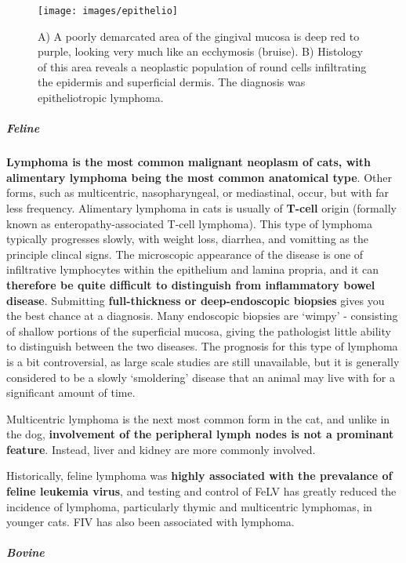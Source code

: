 \documentclass[openany]{article}
\let\oldsubparagraph\subparagraph
\renewcommand{\subparagraph}[1]{\oldsubparagraph{#1}\mbox{}}
\begin{document}
\begin{figure}

{\centering \texttt{[image: images/epithelio]} 

}

\caption{A) A poorly demarcated area of the gingival mucosa is deep red to purple, looking very much like an ecchymosis (bruise). B) Histology of this area reveals a neoplastic population of round cells infiltrating the epidermis and superficial dermis. The diagnosis was epitheliotropic lymphoma.}\label{fig:epithelio}
\end{figure}

\subparagraph{Feline}\label{feline}

\textbf{Lymphoma is the most common malignant neoplasm of cats, with
alimentary lymphoma being the most common anatomical type}. Other forms,
such as multicentric, nasopharyngeal, or mediastinal, occur, but with
far less frequency. Alimentary lymphoma in cats is usually of
\textbf{T-cell} origin (formally known as enteropathy-associated T-cell
lymphoma). This type of lymphoma typically progresses slowly, with
weight loss, diarrhea, and vomitting as the principle clincal signs. The
microscopic appearance of the disease is one of infiltrative lymphocytes
within the epithelium and lamina propria, and it can \textbf{therefore
be quite difficult to distinguish from inflammatory bowel disease}.
Submitting \textbf{full-thickness or deep-endoscopic biopsies} gives you
the best chance at a diagnosis. Many endoscopic biopsies are `wimpy' -
consisting of shallow portions of the superficial mucosa, giving the
pathologist little ability to distinguish between the two diseases. The
prognosis for this type of lymphoma is a bit controversial, as large
scale studies are still unavailable, but it is generally considered to
be a slowly `smoldering' disease that an animal may live with for a
significant amount of time.

Multicentric lymphoma is the next most common form in the cat, and
unlike in the dog, \textbf{involvement of the peripheral lymph nodes is
not a prominant feature}. Instead, liver and kidney are more commonly
involved.

Historically, feline lymphoma was \textbf{highly associated with the
prevalance of feline leukemia virus}, and testing and control of FeLV
has greatly reduced the incidence of lymphoma, particularly thymic and
multicentric lymphomas, in younger cats. FIV has also been associated
with lymphoma.

\subparagraph{Bovine}\label{bovine}
\end{document}
